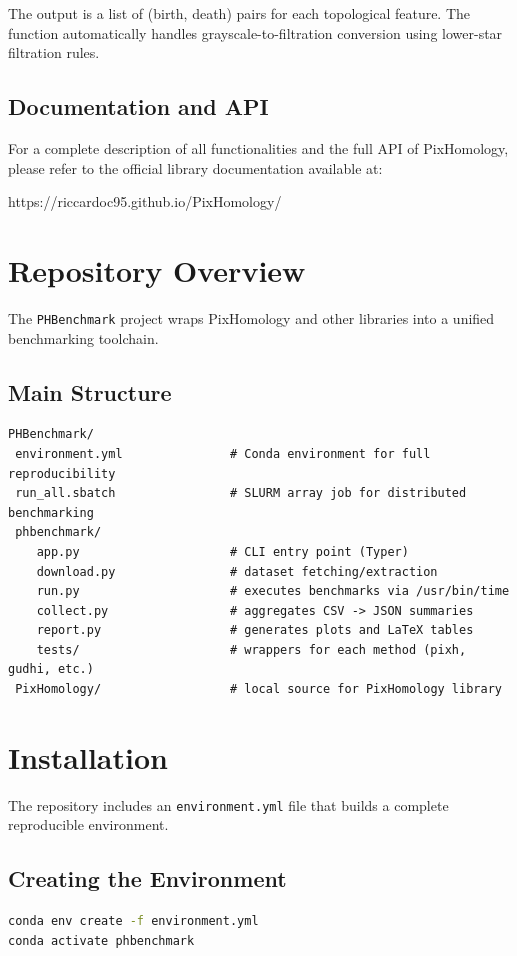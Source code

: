 \documentclass[a4paper,11pt]{article}
\begin{document}
The output is a list of (birth, death) pairs for each topological feature. The function automatically handles grayscale-to-filtration conversion using lower-star filtration rules.

\subsection{Documentation and API}
For a complete description of all functionalities and the full API of PixHomology, please refer to the official library documentation available at:

https://riccardoc95.github.io/PixHomology/

\section{Repository Overview}
The \texttt{PHBenchmark} project wraps PixHomology and other libraries into a unified benchmarking toolchain.

\subsection{Main Structure}
\begin{verbatim}
PHBenchmark/
 environment.yml               # Conda environment for full reproducibility
 run_all.sbatch                # SLURM array job for distributed benchmarking
 phbenchmark/
    app.py                     # CLI entry point (Typer)
    download.py                # dataset fetching/extraction
    run.py                     # executes benchmarks via /usr/bin/time
    collect.py                 # aggregates CSV -> JSON summaries
    report.py                  # generates plots and LaTeX tables
    tests/                     # wrappers for each method (pixh, gudhi, etc.)
 PixHomology/                  # local source for PixHomology library
\end{verbatim}

\section{Installation}
The repository includes an \texttt{environment.yml} file that builds a complete reproducible environment.

\subsection{Creating the Environment}
\begin{lstlisting}[language=bash]
conda env create -f environment.yml
conda activate phbenchmark
\end{lstlisting}
\end{document}
